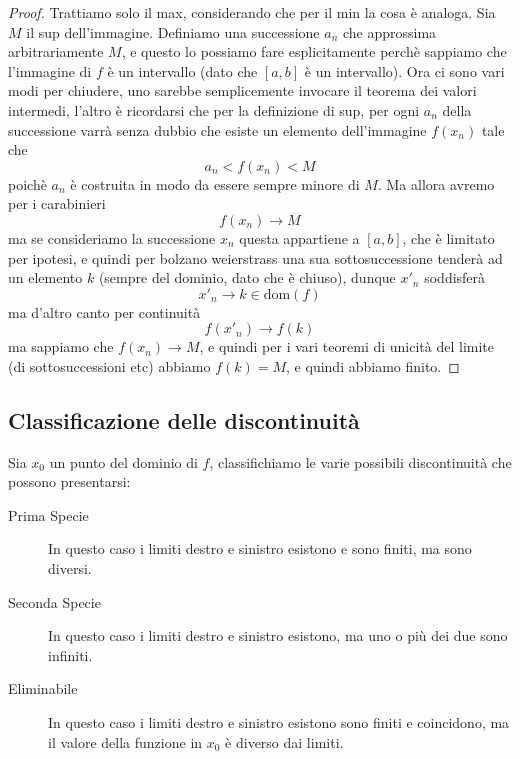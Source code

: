\documentclass[11pt]{scrartcl}
\begin{document}
	\begin{proof}
		Trattiamo solo il max, considerando che per il min la cosa è analoga. Sia $M$ il sup dell'immagine. Definiamo una successione $a_n$ che approssima arbitrariamente $M$, e questo lo possiamo fare esplicitamente perchè sappiamo che l'immagine di $f$ è un intervallo (dato che $[a,b]$ è un intervallo). Ora ci sono vari modi per chiudere, uno sarebbe semplicemente invocare il teorema dei valori intermedi, l'altro è ricordarsi che per la definizione di sup, per ogni $a_n$ della successione varrà senza dubbio che esiste un elemento dell'immagine $f(x_n)$ tale che
		$$a_n<f(x_n)<M$$
		poichè $a_n$ è costruita in modo da essere sempre minore di $M$. Ma allora avremo per i carabinieri
		$$f(x_n)\to M$$
		ma se consideriamo la successione $x_n$ questa appartiene a $[a,b]$, che è limitato per ipotesi, e quindi per bolzano weierstrass una sua sottosuccessione tenderà ad un elemento $k$ (sempre del dominio, dato che è chiuso), dunque $x'_n$ soddisferà
		$$x'_n\to k\in \text{dom}(f)$$
		ma d'altro canto per continuità
		$$f(x'_n)\to f(k) $$
		ma sappiamo che $f(x_n)\to M$, e quindi per i vari teoremi di unicità del limite (di sottosuccessioni etc) abbiamo $f(k)=M$, e quindi abbiamo finito.
	\end{proof}
	\subsection{Classificazione delle discontinuità}
	Sia $x_0$ un punto del dominio di $f$, classifichiamo le varie possibili discontinuità che possono presentarsi:
	\begin{description}
		\item[Prima Specie] In questo caso i limiti destro e sinistro esistono e sono finiti, ma sono diversi.
		\item[Seconda Specie] In questo caso i limiti destro e sinistro esistono, ma uno o più dei due sono infiniti.
		\item[Eliminabile] In questo caso i limiti destro e sinistro esistono sono finiti e coincidono, ma il valore della funzione in $x_0$ è diverso dai limiti.
	\end{description}
\end{document}
